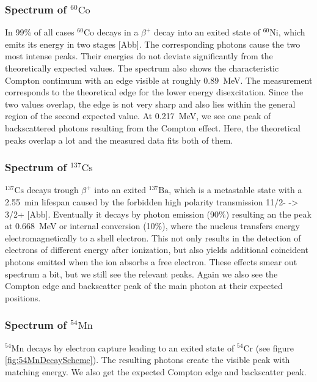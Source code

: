 \subsubsection{Spectrum of $^{60}\text{Co}$}
%
In 99\% of all cases \textbf{$^{60}\text{Co}$} decays in a $\beta^{+}$ decay into an exited state of $^{60}\text{Ni}$, which emits its energy in two stages [Abb].
The corresponding photons cause the two most intense peaks.
Their energies do not deviate significantly from the theoretically expected values.
The spectrum also shows the characteristic Compton continuum with an edge visible at roughly \SI{0.89}{\mega\electronvolt}.
The measurement corresponds to the theoretical edge for the lower energy disexcitation.
Since the two values overlap, the edge is not very sharp and also lies within the general region of the second expected value.
At \SI{0.217}{\mega\electronvolt}, we see one peak of backscattered photons resulting from the Compton effect.
Here, the theoretical peaks overlap a lot and the measured data fits both of them.
%
\subsubsection{Spectrum of $^{137}\text{Cs}$}
%
\textbf{$^{137}\text{Cs}$} decays trough $\beta^{+}$ into an exited $^{137}\text{Ba}$, which is a metastable state with a \SI{2.55}{\minute} lifespan caused by the forbidden high polarity transmission 11/2- -> 3/2+ [Abb].
Eventually it decays by photon emission (90\%) resulting an the peak at \SI{0.668}{\mega\electronvolt} or internal conversion (10\%), where the nucleus transfers energy electromagnetically to a shell electron.
This not only results in the detection of electrons of different energy after ionization, but also yields additional coincident photons emitted when the ion absorbs a free electron.
These effects smear out spectrum a bit, but we still see the relevant peaks.
Again we also see the Compton edge and backscatter peak of the main photon at their expected positions.
%
\subsubsection{Spectrum of $^{54}\text{Mn}$}
%
\textbf{$^{54}\text{Mn}$} decays by electron capture leading to an exited state of $^{54}\text{Cr}$ (see figure \ref{fig:54MnDecayScheme}).
The resulting photons create the visible peak with matching energy.
We also get the expected Compton edge and backscatter peak.
%
